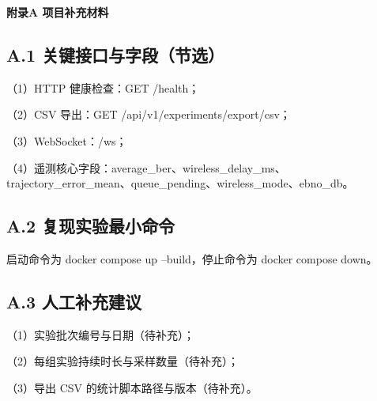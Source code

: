 
\clearpage
{}
{}

{\centering {} \bfseries \heiti 附录A 项目补充材料\par}

\vspace{0.5cm}

 \songti
\setlength{\parindent}{2em}

\subsection*{A.1 关键接口与字段（节选）}
（1）HTTP 健康检查：GET /health；

（2）CSV 导出：GET /api/v1/experiments/export/csv；

（3）WebSocket：/ws；

（4）遥测核心字段：average\_ber、wireless\_delay\_ms、trajectory\_error\_mean、queue\_pending、wireless\_mode、ebno\_db。

\subsection*{A.2 复现实验最小命令}
启动命令为 docker compose up --build，停止命令为 docker compose down。

\subsection*{A.3 人工补充建议}
（1）实验批次编号与日期（待补充）；

（2）每组实验持续时长与采样数量（待补充）；

（3）导出 CSV 的统计脚本路径与版本（待补充）。
